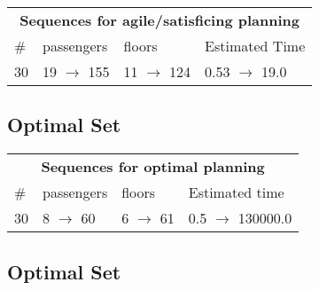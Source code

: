 \documentclass{article}
\begin{document}
                        \begin{center}
                        \begin{tabular}{l|l|l|l}
                        \multicolumn{4}{c}{\bf \large Sequences for agile/satisficing planning}\\
                        \# & passengers & floors & Estimated Time\\\midrule
                        30&19 $\rightarrow$ 155&11 $\rightarrow$ 124&0.53 $\rightarrow$ 19.0
                        \end{tabular}
                        \end{center}
                    
                            \subsection*{Optimal Set}

                            \begin{center}
                            \begin{tabular}{l|l|l|l}
                            \multicolumn{4}{c}{\bf \large Sequences for optimal planning}\\
                            \# & passengers & floors & Estimated time\\\midrule
                            30&8 $\rightarrow$ 60&6 $\rightarrow$ 61&0.5 $\rightarrow$ 130000.0
                            \end{tabular}
                            \end{center}
                    
                                \subsection*{Optimal Set}
                                
\end{document}
